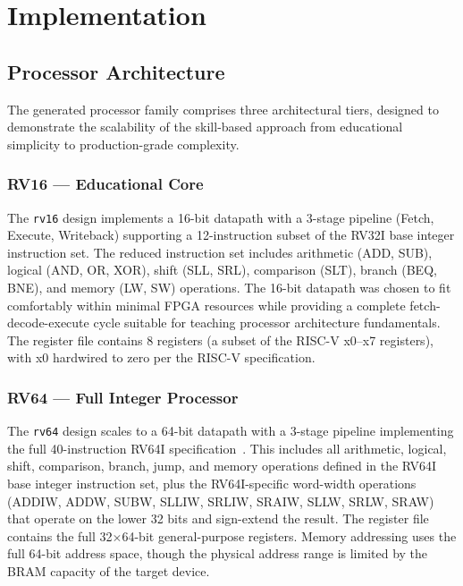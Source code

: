 \documentclass[journal]{IEEEtran}
\begin{document}
\section{Implementation}
\label{sec:implementation}

\subsection{Processor Architecture}
\label{sec:arch}

The generated processor family comprises three architectural tiers,
designed to demonstrate the scalability of the skill-based approach from
educational simplicity to production-grade complexity.

\subsubsection{RV16 --- Educational Core}
The \texttt{rv16} design implements a 16-bit datapath with a 3-stage
pipeline (Fetch, Execute, Writeback) supporting a 12-instruction subset
of the RV32I base integer instruction set.  The reduced instruction set
includes arithmetic (ADD, SUB), logical (AND, OR, XOR), shift (SLL,
SRL), comparison (SLT), branch (BEQ, BNE), and memory (LW, SW)
operations.  The 16-bit datapath was chosen to fit comfortably within
minimal FPGA resources while providing a complete fetch-decode-execute
cycle suitable for teaching processor architecture fundamentals.  The
register file contains 8 registers (a subset of the RISC-V x0--x7
registers), with x0 hardwired to zero per the RISC-V specification.

\subsubsection{RV64 --- Full Integer Processor}
The \texttt{rv64} design scales to a 64-bit datapath with a 3-stage
pipeline implementing the full 40-instruction RV64I
specification~\cite{waterman2019riscv}.  This includes all arithmetic,
logical, shift, comparison, branch, jump, and memory operations defined
in the RV64I base integer instruction set, plus the RV64I-specific
word-width operations (ADDIW, ADDW, SUBW, SLLIW, SRLIW, SRAIW, SLLW,
SRLW, SRAW) that operate on the lower 32 bits and sign-extend the
result.  The register file contains the full 32$\times$64-bit general-purpose
registers.  Memory addressing uses the full 64-bit address space,
though the physical address range is limited by the BRAM capacity of the
target device.
\end{document}
